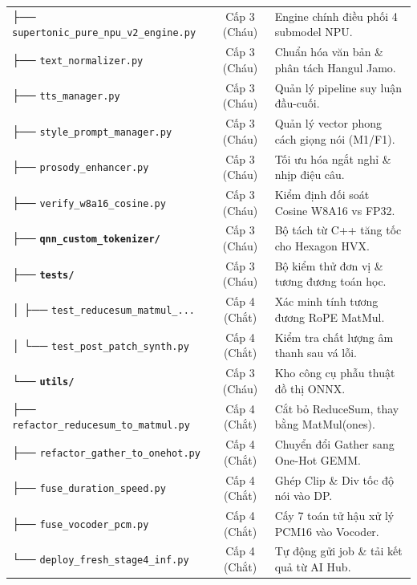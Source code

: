 \documentclass[11pt,a4paper,oneside,table]{report}
\begin{document}
\begin{table}[H]
\begin{tabularx}{\textwidth}{p{7.2cm} c p{6.8cm}}
        ├── \texttt{supertonic\_pure\_npu\_v2\_engine.py} & Cấp 3 (Cháu) & Engine chính điều phối 4 submodel NPU. \\
        ├── \texttt{text\_normalizer.py} & Cấp 3 (Cháu) & Chuẩn hóa văn bản \& phân tách Hangul Jamo. \\
        ├── \texttt{tts\_manager.py} & Cấp 3 (Cháu) & Quản lý pipeline suy luận đầu-cuối. \\
        ├── \texttt{style\_prompt\_manager.py} & Cấp 3 (Cháu) & Quản lý vector phong cách giọng nói (M1/F1). \\
        ├── \texttt{prosody\_enhancer.py} & Cấp 3 (Cháu) & Tối ưu hóa ngắt nghỉ \& nhịp điệu câu. \\
        ├── \texttt{verify\_w8a16\_cosine.py} & Cấp 3 (Cháu) & Kiểm định đối soát Cosine W8A16 vs FP32. \\
        ├── \textbf{\texttt{qnn\_custom\_tokenizer/}} & Cấp 3 (Cháu) & Bộ tách từ C++ tăng tốc cho Hexagon HVX. \\
        ├── \textbf{\texttt{tests/}} & Cấp 3 (Cháu) & Bộ kiểm thử đơn vị \& tương đương toán học. \\
        │   ├── \texttt{test\_reducesum\_matmul\_...} & Cấp 4 (Chắt) & Xác minh tính tương đương RoPE MatMul. \\
        │   └── \texttt{test\_post\_patch\_synth.py} & Cấp 4 (Chắt) & Kiểm tra chất lượng âm thanh sau vá lỗi. \\
        └── \textbf{\texttt{utils/}} & Cấp 3 (Cháu) & Kho công cụ phẫu thuật đồ thị ONNX. \\
            ├── \texttt{refactor\_reducesum\_to\_matmul.py}& Cấp 4 (Chắt) & Cắt bỏ ReduceSum, thay bằng MatMul(ones). \\
            ├── \texttt{refactor\_gather\_to\_onehot.py} & Cấp 4 (Chắt) & Chuyển đổi Gather sang One-Hot GEMM. \\
            ├── \texttt{fuse\_duration\_speed.py} & Cấp 4 (Chắt) & Ghép Clip \& Div tốc độ nói vào DP. \\
            ├── \texttt{fuse\_vocoder\_pcm.py} & Cấp 4 (Chắt) & Cấy 7 toán tử hậu xử lý PCM16 vào Vocoder. \\
            └── \texttt{deploy\_fresh\_stage4\_inf.py} & Cấp 4 (Chắt) & Tự động gửi job \& tải kết quả từ AI Hub. \\
\bottomrule
\end{tabularx}
\end{table}

\end{document}
